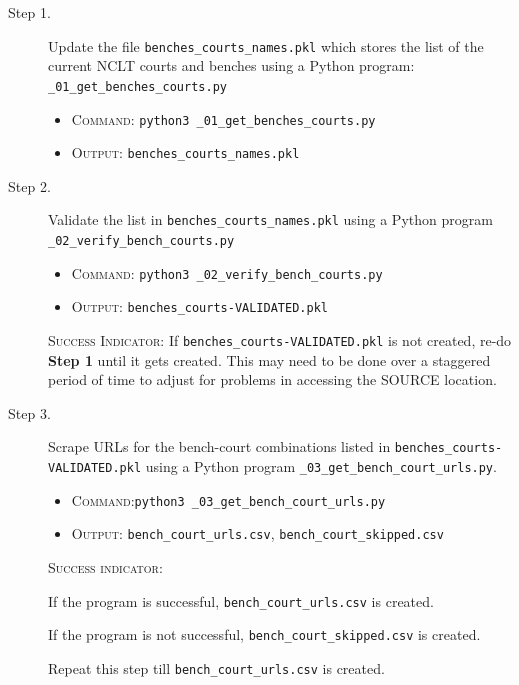 \documentclass[12pt,a4paper]{article}
\begin{document}
\begin{description}
\item[Step 1.] Update the file \texttt{benches\_courts\_names.pkl}
  which stores the list of the current NCLT courts and benches using a
  Python program: \texttt{\_01\_get\_benches\_courts.py}

  \begin{itemize}
  \item \textsc{Command}: \texttt{python3
      \_01\_get\_benches\_courts.py}
  \item \textsc{Output}: \texttt{benches\_courts\_names.pkl}
  \end{itemize}


\item[Step 2.] Validate the list in
  \texttt{benches\_courts\_names.pkl} using a Python program
  \texttt{\_02\_verify\_bench\_courts.py}

  \begin{itemize}
  \item \textsc{Command}: \texttt{python3
      \_02\_verify\_bench\_courts.py}
  \item \textsc{Output}: \texttt{benches\_courts-VALIDATED.pkl}
  \end{itemize}

  \textsc{Success Indicator:} If
  \texttt{benches\_courts-VALIDATED.pkl} is not created, re-do
  \textbf{Step 1} until it gets created. This may need to be done over
  a staggered period of time to adjust for problems in accessing the
  SOURCE location.

\item[Step 3.] Scrape URLs for the bench-court combinations listed in
  \texttt{benches\_courts-VALIDATED.pkl} using a Python program
  \texttt{\_03\_get\_bench\_court\_urls.py}.

  \begin{itemize}
  \item \textsc{Command}:\texttt{python3
      \_03\_get\_bench\_court\_urls.py}
  \item \textsc{Output}: \texttt{bench\_court\_urls.csv}, \texttt{bench\_court\_skipped.csv}
  \end{itemize}

  \textsc{Success indicator:}

  If the program is successful, \texttt{bench\_court\_urls.csv} is
  created.

  If the program is not successful, \texttt{bench\_court\_skipped.csv}
  is created.

  Repeat this step till \texttt{bench\_court\_urls.csv} is created.


\end{description}
\end{document}
